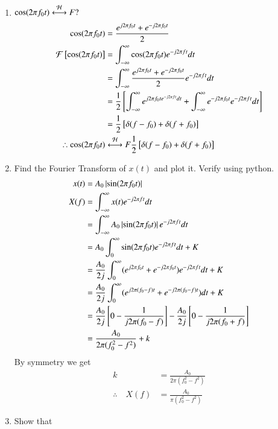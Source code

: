 \documentclass[journal,12pt,twocolumn]{IEEEtran}
\renewcommand\thesection{\arabic{section}}
\begin{document}
\begin{enumerate}[label=\thesection.\arabic*
	,ref=\thesection.\theenumi]
	 By applying the shifting property of impulse 
	 \begin{align}
		f(t) &= e^{-j2\pi f_0t}\\
		i.e., \quad e^{-j2\pi f_0t} &\system{F} \delta(f+f_0)
	 \end{align}
	 \item $\cos(2\pi f_0t)\overset{\mathcal{H}}{ \longleftrightarrow}{F}?$\\
	 \solution \begin{align}
		\cos(2\pi f_0t) &= \frac{e^{j2\pi f_0t}+e^{-j2\pi f_0t}}{2}\\
		\mathcal{F}{}\left[\cos(2\pi f_0t)\right] &= \int_{-\infty}^\infty \cos(2\pi f_0t) e^{-j2\pi ft}dt\\
		&= \int_{-\infty}^\infty \frac{e^{j2\pi f_0t}+e^{-j2\pi f_0t}}{2} e^{-j2\pi ft}dt\\
		&= \frac{1}{2}{}\left[\int_{-\infty}^\infty e^{j2\pi f_0te^{-j2\pi ft}dt}+ \int_{-\infty}^\infty e^{-j2\pi f_0t}e^{-j2\pi ft}dt\right]\\
		&= \frac{1}{2}{}\left[\delta(f-f_0)+\delta(f+f_0)\right]\\
		\therefore \cos(2\pi f_0t)&\overset{\mathcal{H}}{ \longleftrightarrow}{F}\frac{1}{2}{}\left[\delta(f-f_0)+\delta(f+f_0)\right]
	 \end{align}
	 \item Find the Fourier Transform of $x(t)$ and plot it.  Verify using python.\\
	 \solution \begin{align}
		x(t) &= A_0 \left\vert\sin(2\pi f_0 t)\right\vert\\
		X(f)&= \int_{-\infty}^\infty x(t)e^{-j2\pi ft}dt\\
		&= \int_{-\infty}^\infty A_0\left\vert\sin(2\pi f_0t)\right\vert e^{-j2\pi ft}dt\\
		&= A_0 \int_0^\infty \sin(2\pi f_0t)e^{-j2\pi ft}dt + K\\
		&= \frac{A_0}{2j}\int_0^\infty( e^{j2\pi f_0t}+e^{-j2\pi f_0t}) e^{-j2\pi ft} dt + K\\
		&= \frac{A_0}{2j}\int_0^\infty( e^{j2\pi (f_0-f)t}+e^{-j2\pi (f_0-f)t}) dt + K\\
		&= \frac{A_0}{2j} {}\left[0-\frac{1}{j2\pi (f_0-f)}\right]-\frac{A_0}{2j} {}\left[0-\frac{1}{j2\pi (f_0+f)}\right]\\
		&= \frac{A_0}{2\pi (f_0^2-f^2)}+k
	 \end{align}
	 By symmetry we get 
	 \begin{align}
		k &= \frac{A_0}{2\pi (f_0^2-f^2)}\\
		\therefore \quad X(f)&= \frac{A_0}{\pi (f_0^2-f^2)}
	 \end{align}
	 \item Show that 

\end{enumerate}
\end{document}
